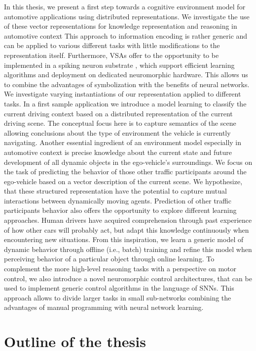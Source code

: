 In this thesis, we present a first step towards a cognitive environment model for automotive applications using distributed representations.
We investigate the use of these vector representations for knowledge representation and reasoning in automotive context 
This approach to information encoding is rather generic and can be applied to various different tasks with little modifications to the representation itself.
Furthermore, \acp{VSA} offer to the opportunity to be implemented in a spiking neuron substrate \parencite{Eliasmith2013}, which support efficient learning algorithms and deployment on dedicated neuromorphic hardware.
This allows us to combine the advantages of symbolization with the benefits of neural networks.
We investigate varying instantiations of our representation applied to different tasks.
In a first sample application we introduce a model learning to classify the current driving context based on a distributed representation of the current driving scene. 
The conceptual focus here is to capture semantics of the scene allowing conclusions about the type of environment the vehicle is currently navigating.
Another essential ingredient of an environment model especially in automotive context is precise knowledge about the current state and future development of all dynamic objects in the ego-vehicle's surroundings.
We focus on the task of predicting the behavior of those other traffic participants around the ego-vehicle based on a vector description of the current scene.
We hypothesize, that these structured representation have the potential to capture mutual interactions between dynamically moving agents.
Prediction of other traffic participants behavior also offers the opportunity to explore different learning approaches.
Human drivers have acquired comprehension through past experience of how other cars will probably act, but adapt this knowledge continuously when encountering new situations.
From this inspiration, we learn a generic model of dynamic behavior through offline (i.e., batch) training and refine this model when perceiving behavior of a particular object through online learning.
To complement the more high-level reasoning tasks with a perspective on motor control, we also introduce a novel neuromorphic control architectures, that can be used to implement generic control algorithms in the language of \acp{SNN}.
This approach allows to divide larger tasks in small sub-networks combining the advantages of manual programming with neural network learning.

\section{Outline of the thesis}%
\label{sec:outline_of_the_thesis}

